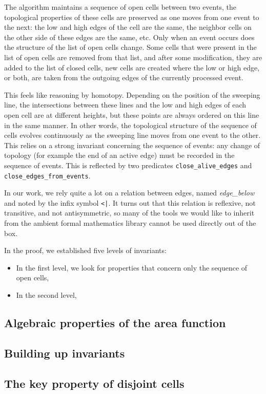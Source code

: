 \documentclass[a4paper, USenglish, cleveref, autoref, thm-restate]{lipics-v2021}
\begin{document}
The algorithm maintains a sequence of open cells between two events,
the topological properties of these cells are preserved as one moves
from one event to the next: the low and high edges of the cell are the
same, the neighbor cells on the other side of these edges are the
same, etc.  Only when an event occurs does the structure of the list
of open cells change.  Some cells that were present in the list of
open cells are removed from that list, and after some modification,
they are added to the list of closed cells, new cells are created
where the low or high edge, or both, are taken from the outgoing edges
of the currently processed event.

This feels like reasoning by homotopy.  Depending on the position of
the sweeping line, the intersections between these lines and the low
and high edges of each open cell are at different heights, but these
points are always ordered on this line in the same manner.  In other
words, the topological structure of the sequence of cells evolves
continuously as the sweeping line moves from one event to the other.
This relies on a strong invariant concerning the sequence of events:
any change of topology (for example the end of an active edge) must be
recorded in the sequence of events.  This is reflected by two
predicates {\tt close\_alive\_edges} and {\tt close\_edges\_from\_events}.

In our work, we rely quite a lot on a relation between edges, named
{\em edge\_below} and noted by the infix symbol {\tt <|}.  It turns
out that this relation is reflexive, not transitive, and not
antisymmetric, so many of the tools we
would like to inherit from the ambient formal mathematics library
cannot be used directly out of the box.

In the proof, we established five levels of invariants:
\begin{itemize}
\item In the first level, we look for properties that concern only the
sequence of open cells,
\item In the second level, 
\end{itemize}

\subsection{Algebraic properties of the area function}
\subsection{Building up invariants}
\subsection{The key property of disjoint cells}
\end{document}
